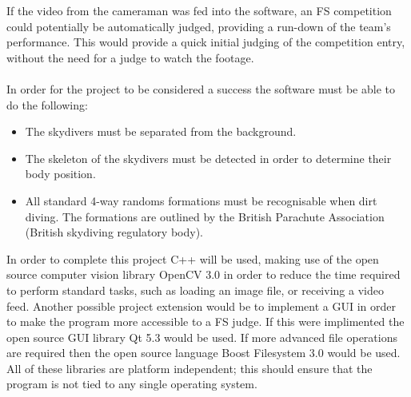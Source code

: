 \documentclass[a4paper, 11pt]{article}
\begin{document}
%
\noindent If the video from the cameraman was fed into the software, an FS competition could potentially be automatically judged, providing a run-down of the team's performance. This would provide a quick initial judging of the competition entry, without the need for a judge to watch the footage.
\\\\
In order for the project to be considered a success the software must be able to do the following:
\begin{itemize}
	\item The skydivers must be separated from the background.
	\item The skeleton of the skydivers must be detected in order to determine their body position.
	\item All standard 4-way randoms formations must be recognisable when dirt diving. The formations are outlined by the British Parachute Association (British skydiving regulatory body).
\end{itemize}

\noindent In order to complete this project C++ will be used, making use of the open source computer vision library OpenCV 3.0 in order to reduce the time required to perform standard tasks, such as loading an image file, or receiving a video feed.
Another possible project extension would be to implement a GUI in order to make the program more accessible to a FS judge. If this were implimented the open source GUI library Qt 5.3 would be used.
If more advanced file operations are required then the open source language Boost Filesystem 3.0 would be used.
All of these libraries are platform independent; this should ensure that the program is not tied to any single operating system.
\end{document}
